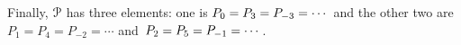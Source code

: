 \documentclass{test}  %
\begin{document}
\begin{problem}
\begin{exes}
\begin{answer}
  Finally, $\EuScript{P}$ has three elements: 
  one is $P_0=P_3=P_{-3}=\cdots\hbox{}$ and the other two are
  $P_1=P_4=P_{-2}=\cdots{}$ and~$P_2=P_5=P_{-1}=\cdots\hbox{}$.  
\end{answer}
\end{exes}



  


\end{problem}
\end{document}
